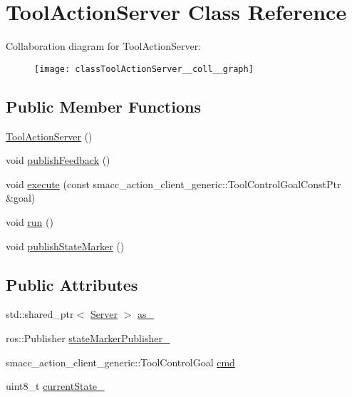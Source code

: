 \hypertarget{classToolActionServer}{}\section{Tool\+Action\+Server Class Reference}
\label{classToolActionServer}


Collaboration diagram for Tool\+Action\+Server\+:
\nopagebreak
\begin{figure}[H]
\begin{center}
\leavevmode
\texttt{[image: classToolActionServer\_\_coll\_\_graph]}
\end{center}
\end{figure}
\subsection*{Public Member Functions}
\begin{DoxyCompactItemize}
\item 
\hyperlink{classToolActionServer_a780b72c834c95d45941ff6374c03c1c6}{Tool\+Action\+Server} ()
\item 
void \hyperlink{classToolActionServer_afe566312095ca250bc32f98a11774f2b}{publish\+Feedback} ()
\item 
void \hyperlink{classToolActionServer_a34bd6fce77510778d5a51385afeb36bb}{execute} (const smacc\+\_\+action\+\_\+client\+\_\+generic\+::\+Tool\+Control\+Goal\+Const\+Ptr \&goal)
\item 
void \hyperlink{classToolActionServer_adbf39061e0f8c74352cbdc695d7d8469}{run} ()
\item 
void \hyperlink{classToolActionServer_aef01c70e358c933855db3a37b46a3740}{publish\+State\+Marker} ()
\end{DoxyCompactItemize}
\subsection*{Public Attributes}
\begin{DoxyCompactItemize}
\item 
std\+::shared\+\_\+ptr$<$ \hyperlink{odom__tracker__node_8cpp_a287066ed24118c12919f0d8ed7e010ff}{Server} $>$ \hyperlink{classToolActionServer_a2b90828292eb25a69449de1e67a173d6}{as\+\_\+}
\item 
ros\+::\+Publisher \hyperlink{classToolActionServer_a1b3cb5d19e61b0207ef3f8fd99fc196d}{state\+Marker\+Publisher\+\_\+}
\item 
smacc\+\_\+action\+\_\+client\+\_\+generic\+::\+Tool\+Control\+Goal \hyperlink{classToolActionServer_ad2320c18b9cf85de44f77e9815368902}{cmd}
\item 
uint8\+\_\+t \hyperlink{classToolActionServer_aac4862d8c313b07e8506eb0c74507fb1}{current\+State\+\_\+}
\end{DoxyCompactItemize}


